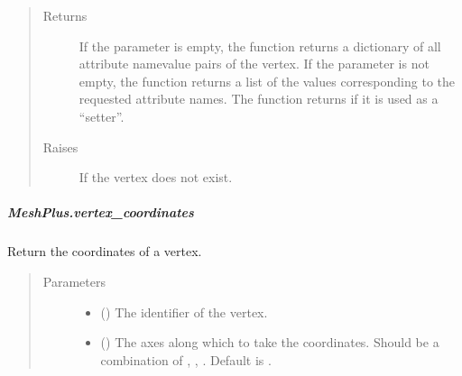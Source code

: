 \documentclass[letterpaper,10pt,english]{sphinxmanual}
\begin{document}
\begin{fulllineitems}
\begin{fulllineitems}
\begin{quote}
\begin{description}
\begin{itemize}
\end{itemize}

\item[{Returns}] \leavevmode
{} \textendash{} If the parameter  is empty,
the function returns a dictionary of all attribute name\sphinxhyphen{}value pairs of the vertex.
If the parameter  is not empty,
the function returns a list of the values corresponding to the requested attribute names.
The function returns  if it is used as a “setter”.

\item[{Raises}] \leavevmode
{} \textendash{} If the vertex does not exist.

\end{description}\end{quote}

\end{fulllineitems}



\subparagraph{MeshPlus.vertex\_coordinates}
\label{\detokenize{api/generated/directional_clustering.mesh.MeshPlus.vertex_coordinates:meshplus-vertex-coordinates}}\label{\detokenize{api/generated/directional_clustering.mesh.MeshPlus.vertex_coordinates::doc}}

\begin{fulllineitems}
\label{\detokenize{api/generated/directional_clustering.mesh.MeshPlus.vertex_coordinates:directional_clustering.mesh.MeshPlus.vertex_coordinates}}
Return the coordinates of a vertex.
\begin{quote}\begin{description}
\item[{Parameters}] \leavevmode\begin{itemize}
\item {} 
 () \textendash{} The identifier of the vertex.

\item {} 
 () \textendash{} The axes along which to take the coordinates.
Should be a combination of , , .
Default is .


\end{itemize}
\end{description}
\end{quote}
\end{fulllineitems}
\end{fulllineitems}
\end{document}
